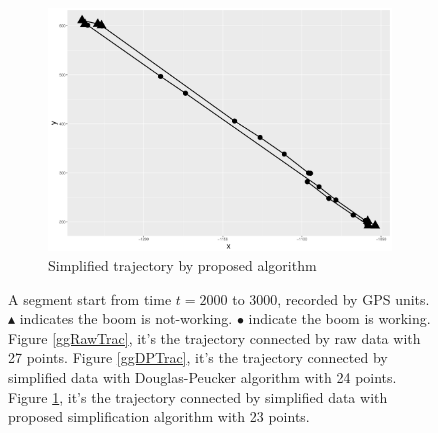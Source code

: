 \begin{figure}[h]
\begin{subfigure}[t]{0.47\textwidth}
\includegraphics[width=\linewidth]{Chapters/06Spinoff/plot/ggSPTrac.pdf}
\caption{Simplified trajectory by proposed algorithm}\label{ggSPTrac}
\end{subfigure}
\caption{A segment start from time $t=2000$ to $3000$, recorded by GPS units. $\blacktriangle$ indicates the boom is not-working. $\bullet$ indicate the boom is working. Figure \ref{ggRawTrac}, it's the trajectory connected by raw data with 27 points. Figure \ref{ggDPTrac}, it's the trajectory connected by simplified data with Douglas-Peucker algorithm with 24 points. Figure \ref{ggSPTrac}, it's the trajectory connected by simplified data with proposed simplification algorithm with 23  points.}\label{DataSimpRawTra}
\end{figure}


